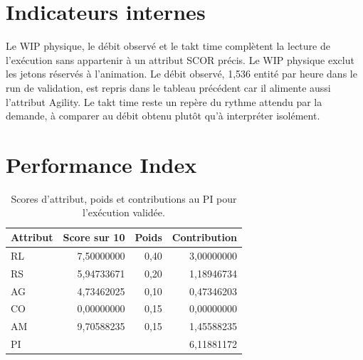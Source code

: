 
\section{Indicateurs internes}

Le WIP physique, le débit observé et le takt time complètent la lecture de l'exécution sans appartenir à un attribut SCOR précis. Le WIP physique exclut les jetons réservés à l'animation. Le débit observé, 1,536 entité par heure dans le run de validation, est repris dans le tableau précédent car il alimente aussi l'attribut Agility. Le takt time reste un repère du rythme attendu par la demande, à comparer au débit obtenu plutôt qu'à interpréter isolément.

\section{Performance Index}

\begin{table}[H]
  \centering
  \begin{tabular}{@{}lrrr@{}}
    \toprule
    Attribut & Score sur 10 & Poids & Contribution \\
    \midrule
    RL & 7,50000000 & 0,40 & 3,00000000 \\
    RS & 5,94733671 & 0,20 & 1,18946734 \\
    AG & 4,73462025 & 0,10 & 0,47346203 \\
    CO & 0,00000000 & 0,15 & 0,00000000 \\
    AM & 9,70588235 & 0,15 & 1,45588235 \\
    \midrule
    PI & \multicolumn{3}{r}{6,11881172} \\
    \bottomrule
  \end{tabular}
  \caption{Scores d'attribut, poids et contributions au PI pour l'exécution validée.}
  \label{tab:pi-annexe}
\end{table}


